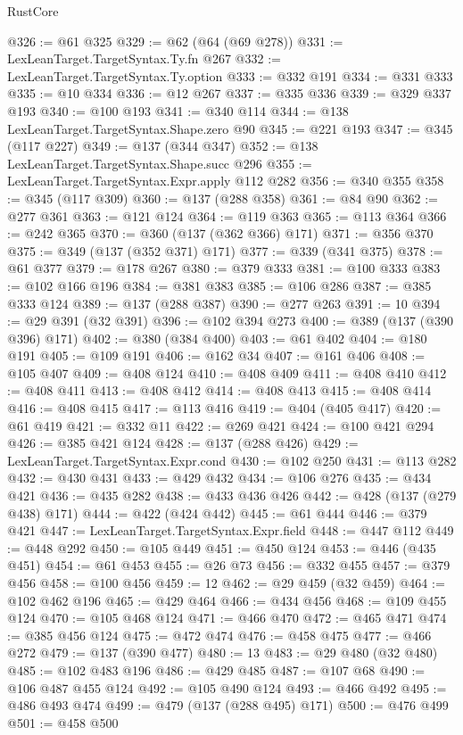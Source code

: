\begin{lexlean}{RustCore}
\begin{coremodule}
@326 := @61 @325
@329 := @62 (@64 (@69 @278))
@331 := LexLeanTarget.TargetSyntax.Ty.fn @267
@332 := LexLeanTarget.TargetSyntax.Ty.option
@333 := @332 @191
@334 := @331 @333
@335 := @10 @334
@336 := @12 @267
@337 := @335 @336
@339 := @329 @337 @193
@340 := @100 @193
@341 := @340 @114
@344 := @138 LexLeanTarget.TargetSyntax.Shape.zero @90
@345 := @221 @193
@347 := @345 (@117 @227)
@349 := @137 (@344 @347)
@352 := @138 LexLeanTarget.TargetSyntax.Shape.succ @296
@355 := LexLeanTarget.TargetSyntax.Expr.apply @112 @282
@356 := @340 @355
@358 := @345 (@117 @309)
@360 := @137 (@288 @358)
@361 := @84 @90
@362 := @277 @361
@363 := @121 @124
@364 := @119 @363
@365 := @113 @364
@366 := @242 @365
@370 := @360 (@137 (@362 @366) @171)
@371 := @356 @370
@375 := @349 (@137 (@352 @371) @171)
@377 := @339 (@341 @375)
@378 := @61 @377
@379 := @178 @267
@380 := @379 @333
@381 := @100 @333
@383 := @102 @166 @196
@384 := @381 @383
@385 := @106 @286
@387 := @385 @333 @124
@389 := @137 (@288 @387)
@390 := @277 @263
@391 := 10
@394 := @29 @391 (@32 @391)
@396 := @102 @394 @273
@400 := @389 (@137 (@390 @396) @171)
@402 := @380 (@384 @400)
@403 := @61 @402
@404 := @180 @191
@405 := @109 @191
@406 := @162 @34
@407 := @161 @406
@408 := @105 @407
@409 := @408 @124
@410 := @408 @409
@411 := @408 @410
@412 := @408 @411
@413 := @408 @412
@414 := @408 @413
@415 := @408 @414
@416 := @408 @415
@417 := @113 @416
@419 := @404 (@405 @417)
@420 := @61 @419
@421 := @332 @11
@422 := @269 @421
@424 := @100 @421 @294
@426 := @385 @421 @124
@428 := @137 (@288 @426)
@429 := LexLeanTarget.TargetSyntax.Expr.cond
@430 := @102 @250
@431 := @113 @282
@432 := @430 @431
@433 := @429 @432
@434 := @106 @276
@435 := @434 @421
@436 := @435 @282
@438 := @433 @436 @426
@442 := @428 (@137 (@279 @438) @171)
@444 := @422 (@424 @442)
@445 := @61 @444
@446 := @379 @421
@447 := LexLeanTarget.TargetSyntax.Expr.field
@448 := @447 @112
@449 := @448 @292
@450 := @105 @449
@451 := @450 @124
@453 := @446 (@435 @451)
@454 := @61 @453
@455 := @26 @73
@456 := @332 @455
@457 := @379 @456
@458 := @100 @456
@459 := 12
@462 := @29 @459 (@32 @459)
@464 := @102 @462 @196
@465 := @429 @464
@466 := @434 @456
@468 := @109 @455 @124
@470 := @105 @468 @124
@471 := @466 @470
@472 := @465 @471
@474 := @385 @456 @124
@475 := @472 @474
@476 := @458 @475
@477 := @466 @272
@479 := @137 (@390 @477)
@480 := 13
@483 := @29 @480 (@32 @480)
@485 := @102 @483 @196
@486 := @429 @485
@487 := @107 @68
@490 := @106 @487 @455 @124
@492 := @105 @490 @124
@493 := @466 @492
@495 := @486 @493 @474
@499 := @479 (@137 (@288 @495) @171)
@500 := @476 @499
@501 := @458 @500

\end{coremodule}
\end{lexlean}
